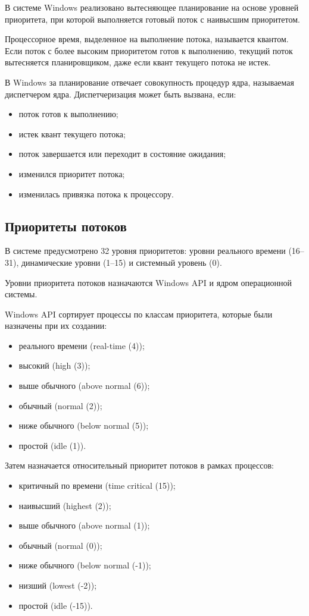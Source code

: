 В системе Windows реализовано вытесняющее планирование на основе уровней приоритета, при которой выполняется готовый поток с наивысшим приоритетом.

Процессорное время, выделенное на выполнение потока, называется квантом. Если поток с более высоким приоритетом готов к выполнению, текущий поток вытесняется планировщиком, даже если квант текущего потока не истек.

В Windows за планирование отвечает совокупность процедур ядра, называемая диспетчером ядра. Диспетчеризация может быть вызвана, если:
\begin{itemize}
	\item поток готов к выполнению;
	\item истек квант текущего потока;
	\item поток завершается или переходит в состояние ожидания;
	\item изменился приоритет потока;
	\item изменилась привязка потока к процессору.
\end{itemize}

\subsection{Приоритеты потоков}

В системе предусмотрено 32 уровня приоритетов: уровни реального времени (16--31), динамические уровни (1--15) и системный уровень (0). 

Уровни приоритета потоков назначаются {\ttfamily Windows API} и ядром операционной системы.

{\ttfamily Windows API} сортирует процессы по классам приоритета, которые были назначены при их создании:
\begin{itemize}
	\item реального времени (real-time (4));
	\item высокий (high (3));
	\item выше обычного (above normal (6));
	\item обычный (normal (2));
	\item ниже обычного (below normal (5));
	\item простой (idle (1)).
\end{itemize}

Затем назначается относительный приоритет потоков в рамках процессов:
\begin{itemize}
	\item критичный по времени (time critical (15));
	\item наивысший (highest (2));
	\item выше обычного (above normal (1));
	\item обычный (normal (0));
	\item ниже обычного (below normal (-1));
	\item низший (lowest (-2));
	\item простой (idle (-15)).
\end{itemize}


